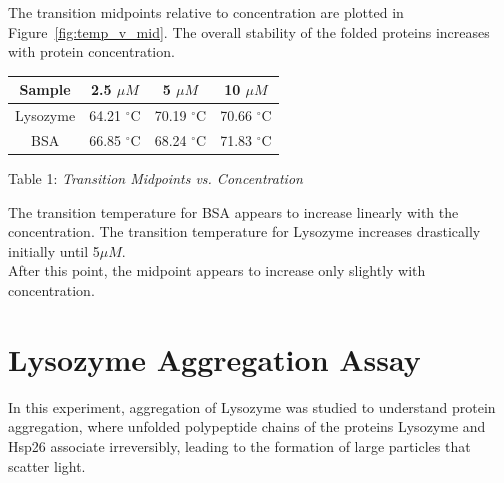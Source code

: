 \documentclass[a4paper,10pt]{article}
\begin{document}
            \begin{minipage}{0.49\textwidth}
                \vspace{-2em}
                The transition midpoints relative to concentration are plotted in Figure~\ref{fig:temp_v_mid}.
                The overall stability of the folded proteins increases with protein concentration.\\

                \begin{tabular}{| c | c | c | c |}
                    \hline
                    Sample & 2.5 $\mu M$ & 5 $\mu M$ & 10 $\mu M$ \\
                    \hline
                    \hline
                    Lysozyme & 64.21 $^{\circ}$C & 70.19 $^{\circ}$C & 70.66 $^{\circ}$C \\
                    BSA & 66.85 $^{\circ}$C & 68.24 $^{\circ}$C & 71.83 $^{\circ}$C \\
                    \hline
                \end{tabular}
                \begin{center}
                    \small Table 1: \it Transition Midpoints vs. Concentration
                    \label{tab:midpoints}
                \end{center}

                The transition temperature for BSA appears to increase linearly with the concentration. The transition temperature for Lysozyme increases drastically initially until 5$\mu M$.\\
                After this point, the midpoint appears to increase only slightly with concentration.
            \end{minipage}
    \pagebreak
    
    \section{Lysozyme Aggregation Assay}
        In this experiment, aggregation of Lysozyme was studied to understand protein aggregation, 
        where unfolded polypeptide chains of the proteins Lysozyme and Hsp26 associate irreversibly, 
        leading to the formation of large particles that scatter light.
        
\end{document}
